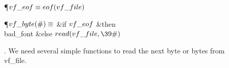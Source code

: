 \Y\P\D {}$\\{vf\_eof}\S\\{eof}(\\{vf\_file})$\par
\P\D {}$\\{vf\_byte}(\#)\S$\1\6
\&{if} $\\{vf\_eof}$ \1\&{then}\5
\\{bad\_font}\6
\4\&{else} $\\{read}(\\{vf\_file},\39\#)$\2\2\par
\fi

. We need several simple functions to read the next byte or bytes
from \\{vf\_file}.

